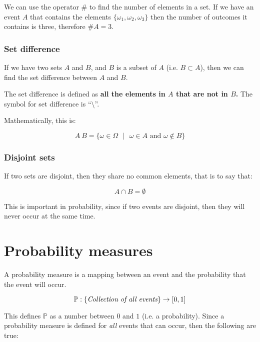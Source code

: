 We can use the operator $\#$ to find the number of elements in a set. If we have
an event $A$ that contains the elements $\{\omega_1, \omega_2, \omega_3\}$ then
the number of outcomes it contains is three, therefore $\#A = 3$.

\subsubsection{Set difference}

If we have two sets $A$ and $B$, and $B$ is a subset of $A$ (i.e. $B \subset
A$), then we can find the set difference between $A$ and $B$.

The set difference is defined as {\bf all the elements in $A$ that are not in
$B$.} The symbol for set difference is ``$\setminus$''.

Mathematically, this is:

\begin{dmath}
	A \ B = \{\omega \in \Omega \textrm{ } \vert \textrm{ } \omega \in A \textrm{ and } \omega \not\in B\}
\end{dmath}

\subsubsection{Disjoint sets}

If two sets are disjoint, then they share no common elements, that is to say
that:

\begin{dmath}
	A \cap B = \emptyset
\end{dmath}

This is important in probability, since if two events are disjoint, then they
will never occur at the same time.

\section{Probability measures}

A probability measure is a mapping between an event and the probability that the
event will occur.

\begin{dmath}
	\mathbb{P} : \{\textrm{\it Collection of all events}\} \rightarrow [0,1]
\end{dmath}

This defines $\mathbb{P}$ as a number between $0$ and $1$ (i.e. a probability).
Since a probability measure is defined for {\it all} events that can occur, then
the following are true:

